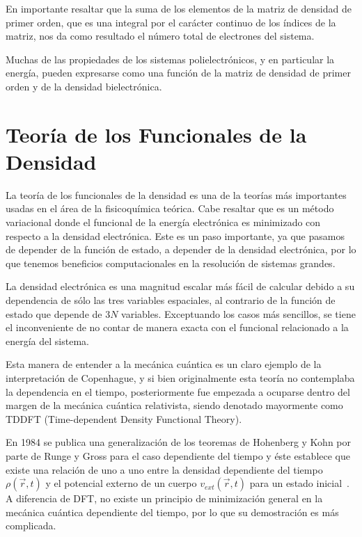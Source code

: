 En importante resaltar que la suma de los elementos de la matriz de densidad de
primer orden, que es una integral por el carácter continuo de los índices de la
matriz, nos da como resultado el número total de electrones del sistema.

Muchas de las propiedades de los sistemas polielectrónicos, y en particular la
energía, pueden expresarse como una función de la matriz de densidad de primer
orden y de la densidad bielectrónica.


\section{Teoría de los Funcionales de la Densidad}

La teoría de los funcionales de la densidad es una de la teorías más
importantes usadas en el área de la fisicoquímica teórica. Cabe resaltar que es
un método variacional donde el funcional de la energía electrónica es
minimizado con respecto a la densidad electrónica.  Este es un paso importante,
ya que pasamos de depender de la función de estado, a depender de la densidad
electrónica, por lo que tenemos beneficios computacionales en la resolución de
sistemas grandes.

La densidad electrónica es una magnitud escalar más fácil de calcular debido a
su dependencia de sólo las tres variables espaciales, al contrario de la
función de estado que depende de 3$N$ variables. Exceptuando los casos más
sencillos, se tiene el inconveniente de no contar de manera exacta con el
funcional relacionado a la energía del sistema.

Esta manera de entender a la mecánica cuántica es un claro ejemplo de la
interpretación de Copenhague, y si bien originalmente esta teoría no
contemplaba la dependencia en el tiempo, posteriormente fue empezada a ocuparse
dentro del margen de la mecánica cuántica relativista, siendo denotado
mayormente como TDDFT (Time-dependent Density Functional Theory).

En 1984 se publica una generalización de los teoremas de Hohenberg y Kohn por
parte de Runge y Gross para el caso dependiente del tiempo y éste establece que
existe una relación de uno a uno entre la densidad dependiente del tiempo $\rho
(\vec{r}, t)$ y el potencial externo de un cuerpo $v_{ext} (\vec{r}, t)$ para
un estado inicial~\cite{Runge1984}.
A diferencia de DFT, no existe un principio de minimización general en la
mecánica cuántica dependiente del tiempo, por lo que su demostración es más
complicada. 

